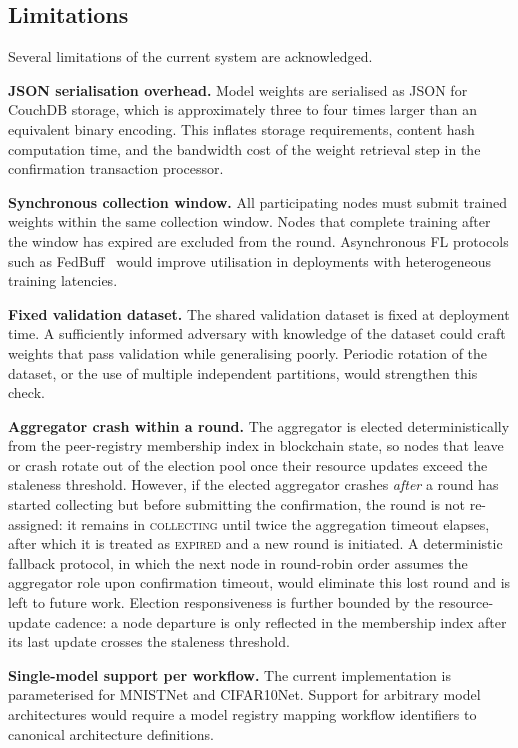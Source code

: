 \documentclass[lettersize,journal]{IEEEtran}
\begin{document}
\subsection{Limitations}

Several limitations of the current system are acknowledged.

\textbf{JSON serialisation overhead.} Model weights are serialised as JSON for CouchDB
storage, which is approximately three to four times larger than an equivalent binary
encoding. This inflates storage requirements, content hash computation time, and the
bandwidth cost of the weight retrieval step in the confirmation transaction processor.

\textbf{Synchronous collection window.} All participating nodes must submit trained
weights within the same collection window. Nodes that complete training after the window
has expired are excluded from the round. Asynchronous FL protocols such as
FedBuff~\cite{nguyen2022federated} would improve utilisation in deployments with
heterogeneous training latencies.

\textbf{Fixed validation dataset.} The shared validation dataset is fixed at deployment
time. A sufficiently informed adversary with knowledge of the dataset could craft weights
that pass validation while generalising poorly. Periodic rotation of the dataset, or the
use of multiple independent partitions, would strengthen this check.

\textbf{Aggregator crash within a round.} The aggregator is elected deterministically
from the peer-registry membership index in blockchain state, so nodes that leave or
crash rotate out of the election pool once their resource updates exceed the staleness
threshold. However, if the elected aggregator crashes \emph{after} a round has started
collecting but before submitting the confirmation, the round is not re-assigned: it
remains in \textsc{collecting} until twice the aggregation timeout elapses, after which
it is treated as \textsc{expired} and a new round is initiated. A deterministic fallback
protocol, in which the next node in round-robin order assumes the aggregator role upon
confirmation timeout, would eliminate this lost round and is left to future work.
Election responsiveness is further bounded by the resource-update cadence: a node
departure is only reflected in the membership index after its last update crosses the
staleness threshold.

\textbf{Single-model support per workflow.} The current implementation is parameterised
for MNISTNet and CIFAR10Net. Support for arbitrary model architectures would require a
model registry mapping workflow identifiers to canonical architecture definitions.
\end{document}

